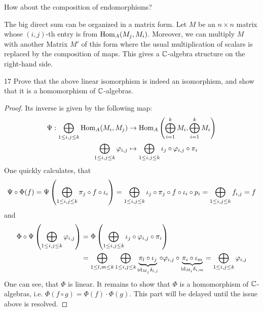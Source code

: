 \documentclass[twoside = false,	%
		headsepline,		%
		parskip = true,
		]{scrbook}						%
\begin{document}
        How about the composition of endomorphisms?

        The big direct sum can be organized in a matrix form. Let $M$ be an $n \times n$ matrix whose $(i,j)$-th entry is from $\mathrm{Hom}_A(M_j,M_i)$. Moreover, we can multiply $M$ with another Matrix $M'$ of this form where the usual multiplication of scalars is replaced by the composition of maps. This gives a $\mathbb C$-algebra structure on the right-hand side.

        \begin{exercise}{}{17}
            Prove that the above linear isomorphism is indeed an isomorphism, and show that it is a homomorphism of $\mathbb C$-algebras.
        \end{exercise}
        \begin{proof}
            Its inverse is given by the following map:
            \begin{equation*}
            \begin{split}
                \Psi: \bigoplus_{1 \leq i,j \leq k} \mathrm{Hom}_A(M_i,M_j) &\to \mathrm{Hom}_A\left( \bigoplus_{i=1}^k M_i,\bigoplus_{i=1}^k M_i\right) \\
                \bigoplus_{1 \leq i,j \leq k} \varphi_{i,j} & \mapsto \bigoplus_{1 \leq i,j \leq k} \iota_j \circ \varphi_{i,j} \circ \pi_i
            \end{split}
            \end{equation*}
            One quickly calculates, that
            \begin{equation*}
                \Psi \circ \Phi (f) = \Psi \left( \bigoplus_{1 \leq i,j \leq k} \pi_j \circ f \circ \iota_i\right) = \bigoplus_{1 \leq i,j \leq k} \iota_j \circ \pi_j \circ f \circ \iota_i \circ p_i = \bigoplus_{1 \leq i,j \leq k} f_{i,j} = f
            \end{equation*}
            and
            \begin{equation*}
            \begin{split}
                \Phi \circ \Psi \left( \bigoplus_{1 \leq i,j \leq k} \varphi_{i,j}\right) &= \Phi \left( \bigoplus_{1 \leq i,j \leq k} \iota_j \circ \varphi_{i,j} \circ \pi_i\right) \\
                &= \bigoplus_{1 \leq l,m \leq k}  \bigoplus_{1 \leq i,j \leq k} \underbrace{\pi_l \circ \iota_j}_{\mathrm{id}_{M_j} \delta_{l,j}} \circ \varphi_{i,j} \circ \underbrace{\pi_i \circ \iota_m}_{\mathrm{id}_{M_i} \delta_{i,m}} 
                = \bigoplus_{1 \leq i,j \leq k} \varphi_{i,j}
            \end{split}
            \end{equation*}
            One can see, that $\Phi$ is linear. It remains to show that $\Phi$ is a homomorphism of $\mathbb C$-algebras, i.e. $\Phi(f \circ g) = \Phi(f) \cdot \Phi(g)$. This part will be delayed until the issue above is resolved.
        \end{proof}
\end{document}
